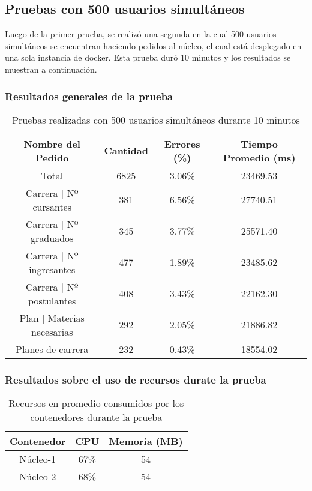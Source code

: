 \subsection{Pruebas con 500 usuarios simultáneos}
Luego de la primer prueba, se realizó una segunda en la cual 500 usuarios simultáneos se encuentran haciendo pedidos al núcleo, el cual está desplegado en una sola instancia de docker.
Esta prueba duró 10 minutos y los resultados se muestran a continuación.

\subsubsection{Resultados generales de la prueba}
\begin{table}[!htbp]
    \centering
    \makegapedcells
    \begin{tabular}{|c|c|c|c|}
    \hline
    Nombre del Pedido & Cantidad & Errores (\%) & Tiempo Promedio (ms) \\ \hline
    Total & 6825 & 3.06\% & 23469.53 \\ \hline
    Carrera | Nº cursantes & 381 & 6.56\% & 27740.51\\ \hline
    Carrera | Nº graduados & 345 & 3.77\% & 25571.40\\ \hline
    Carrera | Nº ingresantes & 477 & 1.89\% & 23485.62\\ \hline
    Carrera | Nº postulantes & 408 & 3.43\% & 22162.30\\ \hline
    Plan | Materias necesarias & 292 & 2.05\% & 21886.82\\ \hline
    Planes de carrera & 232 & 0.43\% & 18554.02\\ \hline

    \end{tabular}
    \caption{Pruebas realizadas con 500 usuarios simultáneos durante 10 minutos}
    \label{tab:tabla_planes}
\end{table}
\subsubsection{Resultados sobre el uso de recursos durate la prueba}
\begin{table}[!htbp]
    \centering
    \makegapedcells
    \begin{tabular}{|c|c|c}
    \hline
    Contenedor & CPU & Memoria (MB)\\ \hline
    Núcleo-1 & 67\% & 54 \\ \hline
    Núcleo-2 & 68\% & 54 \\ \hline
    \end{tabular}
    \caption{Recursos en promedio consumidos por los contenedores durante la prueba}
    \label{tab:tabla_planes}
\end{table}
